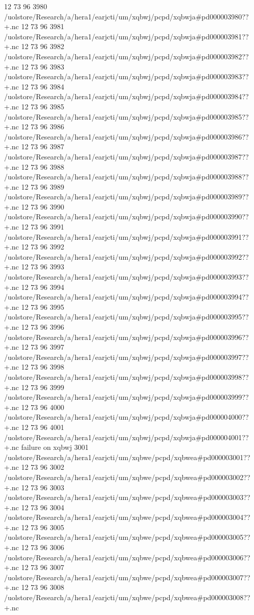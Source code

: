 12 73 96
3980
/uolstore/Research/a/hera1/earjcti/um/xqbwj/pcpd/xqbwja#pd000003980??+.nc
12 73 96
3981
/uolstore/Research/a/hera1/earjcti/um/xqbwj/pcpd/xqbwja#pd000003981??+.nc
12 73 96
3982
/uolstore/Research/a/hera1/earjcti/um/xqbwj/pcpd/xqbwja#pd000003982??+.nc
12 73 96
3983
/uolstore/Research/a/hera1/earjcti/um/xqbwj/pcpd/xqbwja#pd000003983??+.nc
12 73 96
3984
/uolstore/Research/a/hera1/earjcti/um/xqbwj/pcpd/xqbwja#pd000003984??+.nc
12 73 96
3985
/uolstore/Research/a/hera1/earjcti/um/xqbwj/pcpd/xqbwja#pd000003985??+.nc
12 73 96
3986
/uolstore/Research/a/hera1/earjcti/um/xqbwj/pcpd/xqbwja#pd000003986??+.nc
12 73 96
3987
/uolstore/Research/a/hera1/earjcti/um/xqbwj/pcpd/xqbwja#pd000003987??+.nc
12 73 96
3988
/uolstore/Research/a/hera1/earjcti/um/xqbwj/pcpd/xqbwja#pd000003988??+.nc
12 73 96
3989
/uolstore/Research/a/hera1/earjcti/um/xqbwj/pcpd/xqbwja#pd000003989??+.nc
12 73 96
3990
/uolstore/Research/a/hera1/earjcti/um/xqbwj/pcpd/xqbwja#pd000003990??+.nc
12 73 96
3991
/uolstore/Research/a/hera1/earjcti/um/xqbwj/pcpd/xqbwja#pd000003991??+.nc
12 73 96
3992
/uolstore/Research/a/hera1/earjcti/um/xqbwj/pcpd/xqbwja#pd000003992??+.nc
12 73 96
3993
/uolstore/Research/a/hera1/earjcti/um/xqbwj/pcpd/xqbwja#pd000003993??+.nc
12 73 96
3994
/uolstore/Research/a/hera1/earjcti/um/xqbwj/pcpd/xqbwja#pd000003994??+.nc
12 73 96
3995
/uolstore/Research/a/hera1/earjcti/um/xqbwj/pcpd/xqbwja#pd000003995??+.nc
12 73 96
3996
/uolstore/Research/a/hera1/earjcti/um/xqbwj/pcpd/xqbwja#pd000003996??+.nc
12 73 96
3997
/uolstore/Research/a/hera1/earjcti/um/xqbwj/pcpd/xqbwja#pd000003997??+.nc
12 73 96
3998
/uolstore/Research/a/hera1/earjcti/um/xqbwj/pcpd/xqbwja#pd000003998??+.nc
12 73 96
3999
/uolstore/Research/a/hera1/earjcti/um/xqbwj/pcpd/xqbwja#pd000003999??+.nc
12 73 96
4000
/uolstore/Research/a/hera1/earjcti/um/xqbwj/pcpd/xqbwja#pd000004000??+.nc
12 73 96
4001
/uolstore/Research/a/hera1/earjcti/um/xqbwj/pcpd/xqbwja#pd000004001??+.nc
failure on xqbwj
3001
/uolstore/Research/a/hera1/earjcti/um/xqbwe/pcpd/xqbwea#pd000003001??+.nc
12 73 96
3002
/uolstore/Research/a/hera1/earjcti/um/xqbwe/pcpd/xqbwea#pd000003002??+.nc
12 73 96
3003
/uolstore/Research/a/hera1/earjcti/um/xqbwe/pcpd/xqbwea#pd000003003??+.nc
12 73 96
3004
/uolstore/Research/a/hera1/earjcti/um/xqbwe/pcpd/xqbwea#pd000003004??+.nc
12 73 96
3005
/uolstore/Research/a/hera1/earjcti/um/xqbwe/pcpd/xqbwea#pd000003005??+.nc
12 73 96
3006
/uolstore/Research/a/hera1/earjcti/um/xqbwe/pcpd/xqbwea#pd000003006??+.nc
12 73 96
3007
/uolstore/Research/a/hera1/earjcti/um/xqbwe/pcpd/xqbwea#pd000003007??+.nc
12 73 96
3008
/uolstore/Research/a/hera1/earjcti/um/xqbwe/pcpd/xqbwea#pd000003008??+.nc
